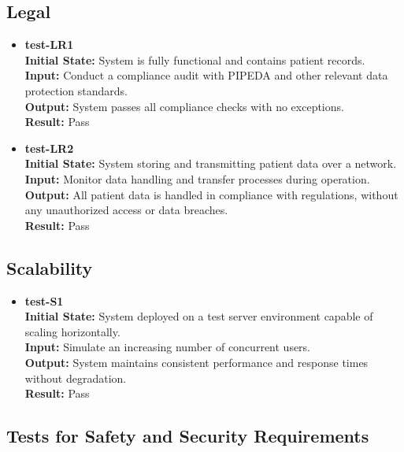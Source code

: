 \documentclass[12pt, titlepage]{article}
\begin{document}
\subsection{Legal} \label{section:4.8}

\begin{itemize}
\item \textbf{test-LR1} \label{test-LR1} \\
\textbf{Initial State:} System is fully functional and contains patient records. \\
\textbf{Input:} Conduct a compliance audit with PIPEDA and other relevant data protection standards. \\
\textbf{Output:} System passes all compliance checks with no exceptions. \\
\textbf{Result:} Pass \\

\item \textbf{test-LR2} \label{test-LR2} \\
\textbf{Initial State:} System storing and transmitting patient data over a network. \\
\textbf{Input:} Monitor data handling and transfer processes during operation. \\
\textbf{Output:} All patient data is handled in compliance with regulations, without any unauthorized access or data breaches. \\
\textbf{Result:} Pass \\
\end{itemize}

\subsection{Scalability} \label{section:4.9}

\begin{itemize}
\item \textbf{test-S1} \label{test-S1} \\
\textbf{Initial State:} System deployed on a test server environment capable of scaling horizontally. \\
\textbf{Input:} Simulate an increasing number of concurrent users. \\
\textbf{Output:} System maintains consistent performance and response times without degradation. \\
\textbf{Result:} Pass \\
\end{itemize}

\subsection{Tests for Safety and Security Requirements} \label{section:4.10}
\end{document}

